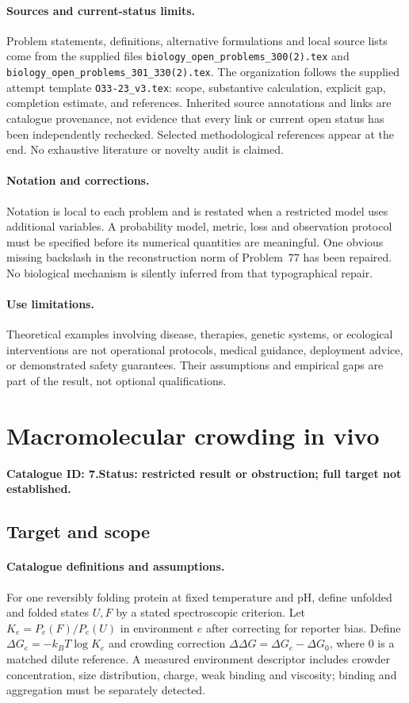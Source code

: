 \documentclass[11pt]{article}
\begin{document}
\paragraph{Sources and current-status limits.}
Problem statements, definitions, alternative formulations and local source lists
come from the supplied files
\texttt{biology\_open\_problems\_300(2).tex} and
\texttt{biology\_open\_problems\_301\_330(2).tex}.
The organization follows the supplied attempt template
\texttt{O33-23\_v3.tex}: scope, substantive calculation, explicit gap,
completion estimate, and references. Inherited source annotations and links are
catalogue provenance, not evidence that every link or current open status has
been independently rechecked. Selected methodological references appear at the
end. No exhaustive literature or novelty audit is claimed.

\paragraph{Notation and corrections.}
Notation is local to each problem and is restated when a restricted model uses
additional variables. A probability model, metric, loss and observation protocol
must be specified before its numerical quantities are meaningful. One obvious
missing backslash in the reconstruction norm of Problem~77 has been repaired.
No biological mechanism is silently inferred from that typographical repair.

\paragraph{Use limitations.}
Theoretical examples involving disease, therapies, genetic systems, or ecological
interventions are not operational protocols, medical guidance, deployment advice,
or demonstrated safety guarantees. Their assumptions and empirical gaps are part
of the result, not optional qualifications.

\setcounter{section}{6}
\section{Macromolecular crowding in vivo}
\label{prob:007}
\noindent\textbf{Catalogue ID: 7.}\quad \textbf{Status: restricted result or obstruction; full target not established.}
\subsection{Target and scope}
\paragraph{Catalogue definitions and assumptions.}
For one reversibly folding protein at fixed temperature and pH, define unfolded and folded states $U,F$ by a stated spectroscopic criterion. Let $K_e=P_e(F)/P_e(U)$ in environment $e$ after correcting for reporter bias. Define $\Delta G_e=-k_BT\log K_e$ and crowding correction $\Delta\Delta G=\Delta G_e-\Delta G_0$, where $0$ is a matched dilute reference. A measured environment descriptor includes crowder concentration, size distribution, charge, weak binding and viscosity; binding and aggregation must be separately detected.
\end{document}
